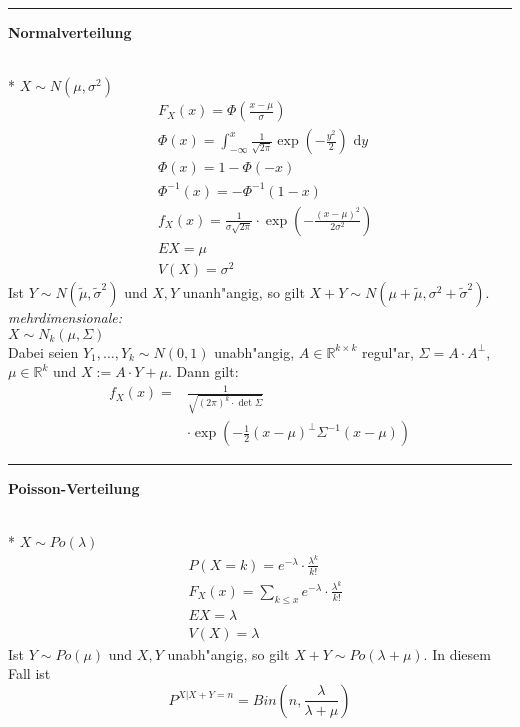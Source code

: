 \documentclass{article}
\newcommand{\hh}[1]{{\vspace{1pt}\hrule\vspace{1pt} \noindent\textbf{#1}}\\*}
\newcommand{\hhh}[1]{{\vspace{1pt}\noindent\emph{#1:}}}
\begin{document}
\begin{multicols}{4}
\hh{Normalverteilung}
$X\sim N(\mu,\sigma^2)$
\begin{align*}
&F_X(x)=\Phi\left(\frac{x-\mu}\sigma\right)\\
&\Phi(x)=\int_{-\infty}^x \frac1{\sqrt{2\pi}}\exp\left(-\frac{y^2}2\right)\text{ d}y\\
&\Phi(x)=1-\Phi(-x)\\
&\Phi^{-1}(x)=-\Phi^{-1}(1-x)\\
&f_X(x)=\frac1{\sigma\sqrt{2\pi}}\cdot\exp\left(-\frac{(x-\mu )^2}{2\sigma^2}\right)\\
&EX=\mu\\
&V(X)=\sigma^2
\end{align*}
Ist $Y\sim N(\tilde\mu,\tilde\sigma^2)$ und $X,Y$ unanh"angig, so gilt $X+Y\sim N(\mu+\tilde\mu,\sigma^2+\tilde\sigma^2)$.
\hhh{mehrdimensionale}\\
$X\sim N_k(\mu,\Sigma)$\\
Dabei seien $Y_1,\ldots, Y_k\sim N(0,1)$ unabh"angig, $A\in\mathbb{R}^{k\times k}$ regul"ar, $\Sigma=A\cdot A^\bot$, $\mu\in\mathbb{R}^k$ und $X:=A\cdot Y+\mu$. Dann gilt:
\begin{align*}
f_X(x)=&\frac1{\sqrt{(2\pi)^k\cdot\det\Sigma}}\\
&\cdot\exp\left(-\frac12(x-\mu)^\bot\Sigma^{-1}(x-\mu)\right)
\end{align*}

\hh{Poisson-Verteilung}
$X\sim Po(\lambda)$
\begin{align*}
&P(X=k)=e^{-\lambda}\cdot\frac{\lambda^k}{k!}\\
&F_X(x)=\sum_{k\le x}e^{-\lambda}\cdot\frac{\lambda^k}{k!}\\
&EX=\lambda\\
&V(X)=\lambda
\end{align*}
Ist $Y\sim Po(\mu)$ und $X,Y$ unabh"angig, so gilt $X+Y\sim Po(\lambda+\mu)$. In diesem Fall ist
\[P^{X|X+Y=n}=Bin\left(n,\frac\lambda{\lambda+\mu}\right)\]

\end{multicols}
\end{document}
